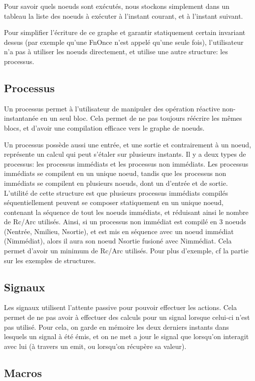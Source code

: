 \documentclass[a4paper]{article}
\renewcommand{\(}{\left(}
\renewcommand{\)}{\right)}
\begin{document}
Pour savoir quels noeuds sont exécutés, nous stockons simplement dans un tableau
la liste des noeuds à exécuter à l'instant courant, et à l'instant suivant.

Pour simplifier l'écriture de ce graphe et garantir statiquement certain
invariant dessus (par exemple qu'une FnOnce n'est appelé qu'une seule fois),
l'utilisateur n'a pas à utiliser les noeuds directement, et utilise une autre
structure: les processus.

\subsection{Processus}
Un processus permet à l'utilisateur de manipuler des opération réactive
non-instantanée en un seul bloc. Cela permet de ne pas toujours réécrire les mêmes
blocs, et d'avoir une compilation efficace vers le graphe de noeuds.

Un processus possède aussi une entrée, et une sortie et contrairement à un
noeud, représente un calcul qui peut s'étaler sur plusieurs instants.
Il y a deux types de
processus: les processus immédiats et les processus non immédiats. Les processus
immédiats se compilent en un unique noeud, tandis que les processus non
immédiats se compilent en plusieurs noeuds, dont un d'entrée et de sortie.
L'utilité de cette structure est que plusieurs processus immédiats compilés
séquentiellement peuvent se composer statiquement en un unique noeud, contenant la séquence
de tout les noeuds immédiats, et réduisant ainsi le nombre de Rc/Arc utilisés.
Ainsi, si un processus non immédiat est compilé en 3 noeuds (Nentrée, Nmilieu,
Nsortie), et est mis en séquence avec un noeud immédiat (Nimmédiat), alors
il aura son noeud Nsortie fusioné avec Nimmédiat.
Cela permet d'avoir un minimum de Rc/Arc utilisés. Pour plus d'exemple, cf la
partie sur les exemples de structures.

\subsection{Signaux}

Les signaux utilisent l'attente passive pour pouvoir effectuer les actions. Cela
permet de ne pas avoir à effectuer des calculs pour un signal lorsque celui-ci
n'est pas utilisé. Pour cela, on garde en mémoire les deux derniers instants
dans lesquels un signal à été émis, et on ne met a jour le signal que lorsqu'on
interagit avec lui (à travers un emit, ou lorsqu'on récupère sa valeur).

\subsection{Macros}
\end{document}
